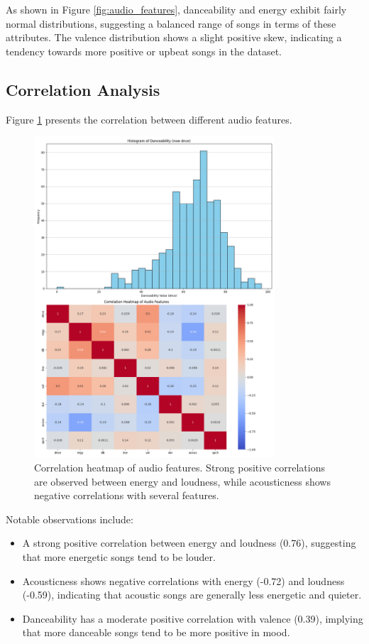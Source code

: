 \documentclass[runningheads]{llncs}
\begin{document}
As shown in Figure \ref{fig:audio_features}, danceability and energy exhibit fairly normal distributions, suggesting a balanced range of songs in terms of these attributes. The valence distribution shows a slight positive skew, indicating a tendency towards more positive or upbeat songs in the dataset.

\subsection{Correlation Analysis}

Figure \ref{fig:correlation} presents the correlation between different audio features.

\begin{figure}[h]
    \centering
    \includegraphics[width=0.8\textwidth]{correlation_heatmap.png}
    \caption{Correlation heatmap of audio features. Strong positive correlations are observed between energy and loudness, while acousticness shows negative correlations with several features.}
    \label{fig:correlation}
\end{figure}

Notable observations include:

\begin{itemize}
    \item A strong positive correlation between energy and loudness (0.76), suggesting that more energetic songs tend to be louder.
    \item Acousticness shows negative correlations with energy (-0.72) and loudness (-0.59), indicating that acoustic songs are generally less energetic and quieter.
    \item Danceability has a moderate positive correlation with valence (0.39), implying that more danceable songs tend to be more positive in mood.
\end{itemize}
\end{document}
